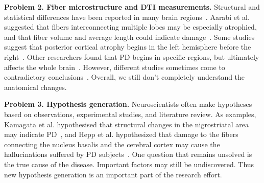 \vspace{1pt}
\noindent\textbf{Problem 2. Fiber microstructure and DTI measurements.}
Structural and statistical differences 
have been reported in many brain regions~\cite{zhang2015diffusion, wei2016combined,aarabi2015statistical}. Aarabi et al. suggested that fibers interconnecting multiple lobes may be 
especially atrophied, and that fiber volume and average 
length could %
indicate damage~\cite{aarabi2015statistical}. Some studies
suggest that posterior cortical atrophy begins in the left hemisphere before the right~\cite{claassen2016cortical}. 
Other researchers found that PD %
begins in specific regions, but ultimately affects the whole brain~\cite{olde2013disrupted, yau2018network}.
However, different studies sometimes come to contradictory conclusions~\cite{zhang2015diffusion, wen2016white}. Overall, we still don't completely understand the anatomical changes.

\vspace{1pt}
\noindent\textbf{Problem 3. Hypothesis generation.}
Neuroscientists often make hypotheses based on observations, experimental studies, and literature review. As examples, Kamagata et al. hypothesised that 
structural 
changes in the nigrostriatal area 
may indicate PD~\cite{kamagata2016neurite}, and Hepp et al. hypothesized that damage to the fibers
connecting the nucleus basalis
and the cerebral cortex may cause the hallucinations suffered by PD subjects~\cite{hepp2017damaged}. One 
question that remains unsolved is the true cause of the disease.  
Important factors may still be 
undiscovered.
Thus new hypothesis generation is an important part of the
research effort. 

